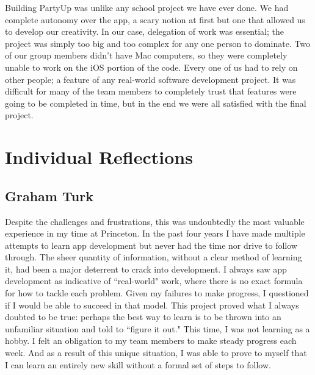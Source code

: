 \documentclass[12pt]{article}
\begin{document}
Building PartyUp was unlike any school project we have ever done. 
We had complete autonomy over the app, a scary notion at first but one that allowed us to develop our creativity. 
In our case, delegation of work was essential; the project was simply too big and too complex for any one person to dominate. 
Two of our group members didn't have Mac computers, so they were completely unable to work on the iOS portion of the code. 
Every one of us had to rely on other people; a feature of any real-world software development project. 
It was difficult for many of the team members to completely trust that features were going to be completed in time, but in the end we were all satisfied with the final project.

\section{Individual Reflections}

\subsection{Graham Turk}

Despite the challenges and frustrations, this was undoubtedly the most valuable experience in my time at Princeton. In the past four years I have made multiple attempts to learn app development but never had the time nor drive to follow through. The sheer quantity of information, without a clear method of learning it, had been a major deterrent to crack into development. I always saw app development as indicative of ``real-world" work, where there is no exact formula for how to tackle each problem. Given my failures to make progress, I questioned if I would be able to succeed in that model. This project proved what I always doubted to be true: perhaps the best way to learn is to be thrown into an unfamiliar situation and told to ``figure it out." This time, I was not learning as a hobby. I felt an obligation to my team members to make steady progress each week. And as a result of this unique situation, I was able to prove to myself that I can learn an entirely new skill without a formal set of steps to follow. 
\end{document}
